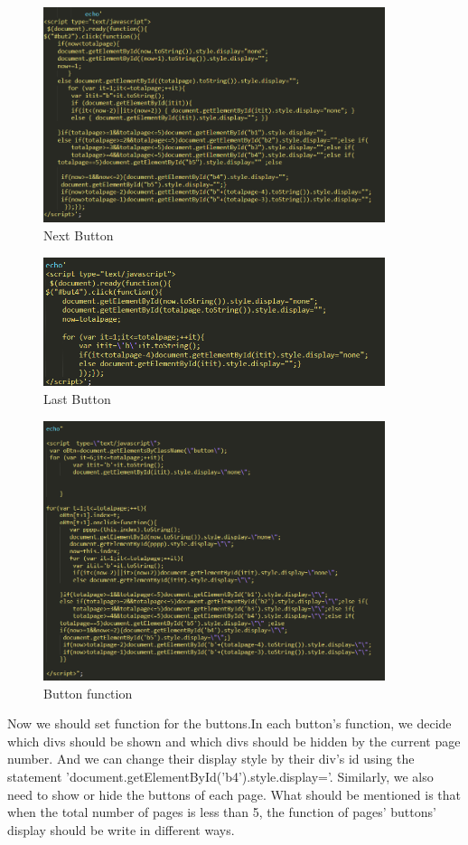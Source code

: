 \documentclass{book}
\begin{document}
\begin{figure}[H]
\centering
\includegraphics[width=10.0cm]{img/dsw_next1.png}
\caption{Next Button}
\end{figure}

\begin{figure}[H]
\centering
\includegraphics[width=10.0cm]{img/dsw_last1.png}
\caption{Last Button}
\end{figure}

\begin{figure}[H]
\centering
\includegraphics[width=10.0cm]{img/dsw_fun.png}
\caption{Button function}
\end{figure}

Now we should set function for the buttons.In each button's function, we decide which divs should be shown and which divs should be hidden by the current page number. And we can change their display style by their div's id using the statement 'document.getElementById('b4').style.display='. Similarly, we also need to show or hide the buttons of each page. What should be mentioned is that when the total number of pages is less than 5, the function of pages' buttons' display should be write in different ways.\\\\
\end{document}
